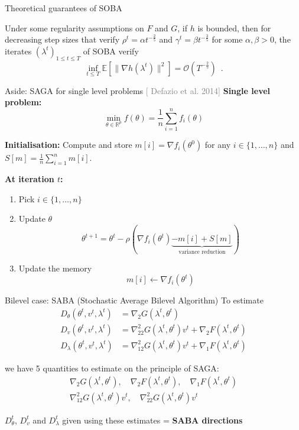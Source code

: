 \documentclass{beamer}
\newcommand{\citeline}[1]{\textcolor{gray}{\small[{\color{linkcolor} #1}]}}
\begin{document}
\begin{frame}{Theoretical guarantees of SOBA}
    \begin{theorem}
        Under some regularity assumptions on $F$ and $G$, if $h$ is bounded, then for decreasing step sizes that verify $\rho^t = \alpha t^{-\frac25}$ and $\gamma^t = \beta t^{-\frac35}$ for some $\alpha, \beta>0$, the iterates $(\lambda^t)_{1\leq t\leq T}$ of SOBA verify
        $$
        \inf_{t\leq T} \mathbb E[\|\nabla h(\lambda^t)\|^2] = \mathcal O(T^{-\frac25})\enspace .
        $$
    \end{theorem}
\end{frame}

\begin{frame}{Aside: SAGA for single level problems \citeline{Defazio et al. 2014}}
    \textbf{Single level problem:}
    $$\min_{\theta\in\mathbb R^p} f(\theta) = \frac1n\sum_{i=1}^n f_i(\theta)$$

    \pause
    \textbf{Initialisation: } Compute and store $m[i] = \nabla f_i(\theta^0)$ for any $i\in\{1,\dots,n\}$ and $S[m] = \frac1n\sum_{i=1}^n m[i]$.

    \pause
    \textbf{At iteration $t$:}
    \begin{enumerate}
        \item Pick $i\in\{1,\dots,n\}$
        \item Update $\theta$
        $$\theta^{t+1} = \theta^t - \rho (\nabla f_i(\theta^t) \underbrace{- m[i] + S[m]}_{\text{variance reduction}}) $$
        \item Update the memory
        $$m[i] \leftarrow \nabla f_i(\theta^t)$$
    \end{enumerate}
\end{frame}

\begin{frame}{Bilevel case: SABA (Stochastic Average Bilevel Algorithm)}
To estimate
\begin{align*}
    D_\theta(\theta^t, v^t, \lambda^t) &= \nabla_2 G(\lambda^t, \theta^t) \\
    D_v(\theta^t, v^t, \lambda^t) &= \nabla^2_{22} G(\lambda^t, \theta^t)v^t + \nabla_2 F(\lambda^t, \theta^t) \\
    D_\lambda(\theta^t, v^t, \lambda^t) &= \nabla^2_{12} G(\lambda^t, \theta^t)v^t + \nabla_1 F(\lambda^t, \theta^t)
\end{align*}

we have 5 quantities to estimate on the principle of SAGA:
\begin{gather*}
    \nabla_2 G(\lambda^t, \theta^t),\quad \nabla_2 F(\lambda^t, \theta^t),\quad \nabla_1 F(\lambda^t, \theta^t)\\
    \nabla_{12}^2G(\lambda^t, \theta^t)v^t,\quad\nabla_{22}^2G(\lambda^t, \theta^t) v^t
\end{gather*}

\vspace{.5cm}
$D^t_\theta$, $D^t_v$ and $D^t_\lambda$ given using these estimates = \textbf{SABA directions}

\end{frame}
\end{document}
